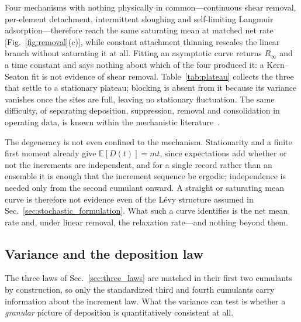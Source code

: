 \documentclass[preprint,12pt]{elsarticle}
\begin{document}
Four mechanisms with nothing physically in common---continuous shear
removal, per-element detachment, intermittent sloughing and self-limiting
Langmuir adsorption---therefore reach the same saturating mean at matched net
rate [Fig.~\ref{fig:removal}(c)], while constant attachment thinning rescales the linear branch without
saturating it at all. Fitting an asymptotic curve returns $R_\infty$ and a
time constant and says nothing about which of the four produced it: a
Kern--Seaton fit is not evidence of shear removal.
Table~\ref{tab:plateau} collects the three that settle to a stationary
plateau; blocking is absent from it because its variance vanishes once the
sites are full, leaving no stationary fluctuation. The same difficulty, of
separating deposition, suppression, removal and consolidation in operating
data, is known within the mechanistic literature~\cite{Diaz-Bejarano24052017}.

The degeneracy is not even confined to the mechanism. Stationarity and a
finite first moment already give $\mathbb{E}[D(t)]=mt$, since expectations
add whether or not the increments are independent, and for a single record
rather than an ensemble it is enough that the increment sequence be ergodic;
independence is needed only from the second cumulant onward. A straight or
saturating mean curve is therefore not evidence even of the L\'evy structure
assumed in Sec.~\ref{sec:stochastic_formulation}. What such a curve identifies is the net mean
rate and, under linear removal, the relaxation rate---and nothing beyond
them.


\subsection{Variance and the deposition law}
\label{sec:variance_test}

The three laws of Sec.~\ref{sec:three_laws} are matched in their first two
cumulants by construction, so only the standardized third and fourth cumulants
carry information about the increment law. What the variance can test is
whether a \emph{granular} picture of deposition is quantitatively consistent at
all.
\end{document}

